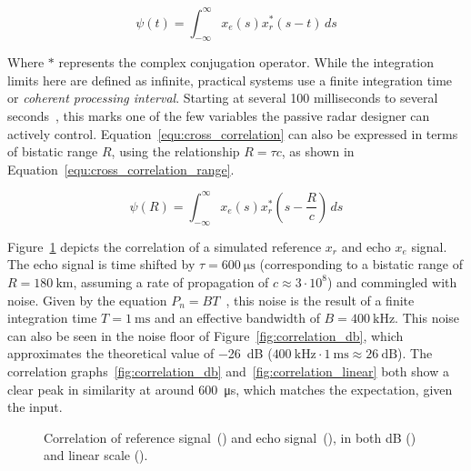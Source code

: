 \begin{equation}\label{equ:cross_correlation}
    \psi(t) = \int_{-\infty}^{\infty}{ x_{e}(s) x_{r}^{*}(s - t) \, d s}
\end{equation}

Where \(*\) represents the complex conjugation operator. While the integration limits here are defined as infinite, practical systems use a finite integration time or \emph{coherent processing interval}. Starting at several 100 milliseconds to several seconds~\cite[p.~134]{Malanowski2019}, this marks one of the few variables the passive radar designer can actively control. Equation~\ref{equ:cross_correlation} can also be expressed in terms of bistatic range \(R\), using the relationship \(R = \tau c\), as shown in Equation~\ref{equ:cross_correlation_range}.

\begin{equation}\label{equ:cross_correlation_range}
    \psi(R) = \int_{-\infty}^{\infty}{ x_{e}(s) x_{r}^{*} \left( s - \frac{R}{c} \right) \, d s}
\end{equation}

Figure~\ref{fig:signal_correlation} depicts the correlation of a simulated reference \(x_r\) and echo \(x_e\) signal. The echo signal is time shifted by \(\tau = \SI{600}{\micro\second}\) (corresponding to a bistatic range of \(R = \SI{180}{\kilo\metre}\), assuming a rate of propagation of \(c \approx 3 \cdot 10^{8}\)) and commingled with noise. Given by the equation \(P_n = BT\)~\cite[pp.~40--44]{Malanowski2019}, this noise is the result of a finite integration time \(T = \SI{1}{\milli\second}\) and an effective bandwidth of \(B = \SI{400}{\kilo\hertz}\). This noise can also be seen in the noise floor of Figure~\ref{fig:correlation_db}, which approximates the theoretical value of \SI{-26}{\deci\bel} (\(\SI{400}{\kilo\hertz} \cdot \SI{1}{\milli\second} \approx \SI{26}{\deci\bel}\)). The correlation graphs~\ref{fig:correlation_db} and~\ref{fig:correlation_linear} both show a clear peak in similarity at around \SI{600}{\micro\second}, which matches the expectation, given the input.

\begin{figure}[htb]
    \centering
    \linebreak
    \caption{Correlation of reference signal~() and echo signal~(), in both \si{\deci\bel} () and linear scale ().}\label{fig:signal_correlation}
\end{figure}

